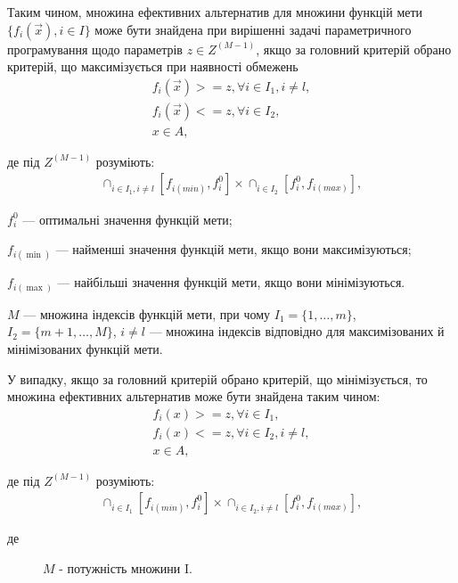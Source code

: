 Таким чином, множина ефективних альтернатив для множини функцій мети $\{f_i(\vec{x}), i \in I\}$ може бути знайдена при вирішенні задачі параметричного програмування щодо параметрів $z \in Z^{(M-1)}$, якщо за головний критерій обрано критерій, що максимізується при наявності обмежень
\begin{gather*} 
    f_i (\vec{x}) >= z, \forall i \in I_1, i \not = l,\\
    f_i (\vec{x}) <= z, \forall i \in I_2,  \\
    x \in A,
\end{gather*}

де під $Z^{(M-1)}$ розуміють:
\begin{gather*}
    \cap_{i \in I_1, i \not = l} ^ {} [f_{i(min)}, f_i^0] \times \cap_{i \in I_2} ^ {} [f_i^0, f_{i(max)}],
\end{gather*}
\begin{description}
    \item[де] $f_i^0$ --- оптимальні значення функцій мети;
    \item $f_{i(\min)}$ --- найменші значення функцій мети, якщо вони максимізуються;
    \item $f_{i(\max)}$ --- найбільші значення функцій мети, якщо вони мінімізуються.
    \item $M$ --- множина індексів функцій мети, при чому $I_1=\{1, \ldots, m\}$, $I_2 = \{m + 1, \ldots, M\}$, $i \not = l$ --- множина індексів відповідно для максимізованих й мінімізованих функцій мети.
\end{description}

У випадку, якщо за головний критерій обрано критерій, що мінімізується, то множина ефективних альтернатив може бути знайдена таким чином: 
\begin{gather*} 
    f_i (x) >= z, \forall i \in I_1, \\
    f_i (x) <= z, \forall i \in I_2, i \not = l, \\
    x \in A,
\end{gather*}

де під $Z^{(M-1)}$ розуміють:
\begin{gather*}
    \cap_{i \in I_1} ^ {} [f_{i(min)}, f_i^0] \times \cap_{i \in I_2, i \not = l} ^ {} [f_i^0, f_{i(max)}],
\end{gather*}
\begin{description}
    \item[де] $M$ - потужність множини I.
\end{description}

